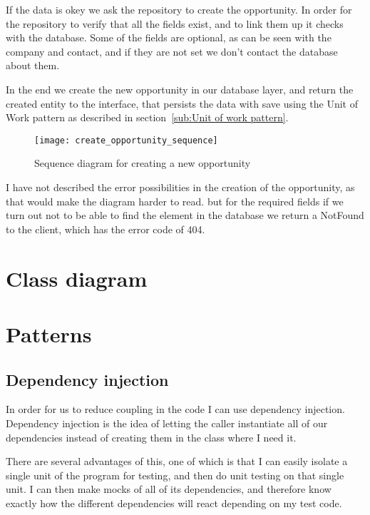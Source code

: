 If the data is okey we ask the repository to create the opportunity. In order
for the repository to verify that all the fields exist, and to link them up it
checks with the database. Some of the fields are optional, as can be seen with
the company and contact, and if they are not set we don't contact the database
about them.

In the end we create the new opportunity in our database layer, and return the
created entity to the interface, that persists the data with save using the Unit
of Work pattern as described in section~\ref{sub:Unit of work pattern}.

\begin{figure}[!htb]
\centering
\texttt{[image: create\_opportunity\_sequence]}
\caption{Sequence diagram for creating a new opportunity}
\label{fig:opportunity_sequence}
\end{figure}

I have not described the error possibilities in the creation of the opportunity,
as that would make the diagram harder to read. but for the required fields if we
turn out not to be able to find the element in the database we return a NotFound
to the client, which has the error code of 404.

\section{Class diagram}
\label{sec:class_diagram}

\section{Patterns}
\label{sec:Patterns}

\subsection{Dependency injection}
\label{sub:Dependency injection}
In order for us to reduce coupling in the code I can use dependency injection. Dependency injection is the idea of letting the caller instantiate all of our dependencies instead of creating them in the class where I need it.

There are several advantages of this, one of which is that I can easily isolate a single unit of the program for testing, and then do unit testing on that single unit. I can then make mocks of all of its dependencies, and therefore know exactly how the different dependencies will react depending on my test code\cite{dependency_injection}.

